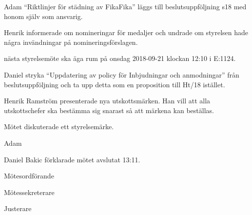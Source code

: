 \documentclass[10pt]{article}
\def\mo{Daniel Bakic}
\def\ms{Axel Voss}
\def\ji{Alexander Wik}
\begin{document}
\begin{paragrafer}
    Adam \ypa ``Riktlinjer för städning av FikaFika'' läggs till beslutsuppföljning s18 med honom själv som ansvarig.

    \Mbaby


    Henrik informerade om nomineringar för medaljer och undrade om styrelsen hade några invändningar på nomineringsförslagen.
    
    \Mdf


    \Mba nästa styrelsemöte ska äga rum på onsdag 2018-09-21 klockan 12:10 i E:1124.


    Daniel \ypa stryka ``Uppdatering av policy för Inbjudningar och anmodningar'' från beslutsuppföljning och ta upp detta som en proposition till Ht/18 istället.

    \Mbaby 	

    Henrik Ramström presenterade nya utskottsmärken. Han vill att alla utskottschefer ska bestämma sig snarast så att märkena kan beställas.  

    Mötet diskuterade ett styrelsemärke. 

    Adam 
    
    \Mbaby
    {\mo} förklarade mötet avslutat 13:11.
\end{paragrafer}
    
\hidesignfoot
\begin{signatures}{3}
    \signature{\mo}{Mötesordförande}
    \signature{\ms}{Mötessekreterare}
    \signature{\ji}{Justerare}
\end{signatures}
\end{document}
